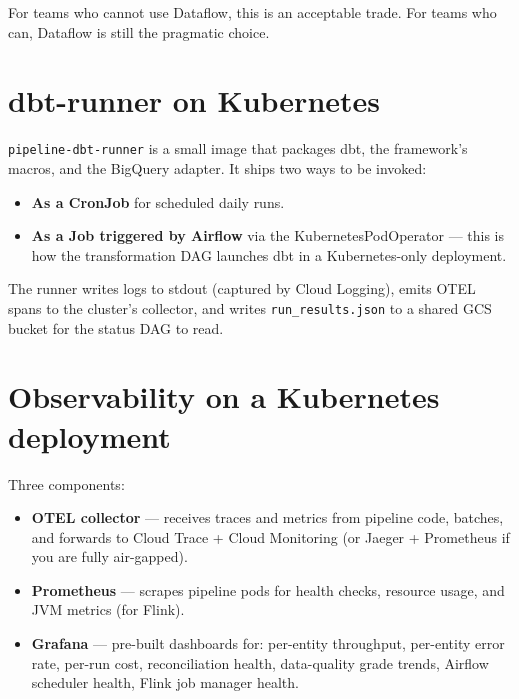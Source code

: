 \documentclass[
  11pt,
  british,
  oneside]{book}
\providecommand{\tightlist}{%
  \setlength{\itemsep}{0pt}\setlength{\parskip}{0pt}}
\begin{document}
For teams who cannot use Dataflow, this is an acceptable trade. For
teams who can, Dataflow is still the pragmatic choice.

\hypertarget{dbt-runner-on-kubernetes}{%
\section{dbt-runner on Kubernetes}\label{dbt-runner-on-kubernetes}}

\texttt{pipeline-dbt-runner} is a small image that packages dbt, the
framework's macros, and the BigQuery adapter. It ships two ways to be
invoked:

\begin{itemize}
\tightlist
\item
  \textbf{As a CronJob} for scheduled daily runs.
\item
  \textbf{As a Job triggered by Airflow} via the KubernetesPodOperator
  --- this is how the transformation DAG launches dbt in a
  Kubernetes-only deployment.
\end{itemize}

The runner writes logs to stdout (captured by Cloud Logging), emits OTEL
spans to the cluster's collector, and writes \texttt{run\_results.json}
to a shared GCS bucket for the status DAG to read.

\hypertarget{observability-on-a-kubernetes-deployment}{%
\section{Observability on a Kubernetes
deployment}\label{observability-on-a-kubernetes-deployment}}

Three components:

\begin{itemize}
\tightlist
\item
  \textbf{OTEL collector} --- receives traces and metrics from pipeline
  code, batches, and forwards to Cloud Trace + Cloud Monitoring (or
  Jaeger + Prometheus if you are fully air-gapped).
\item
  \textbf{Prometheus} --- scrapes pipeline pods for health checks,
  resource usage, and JVM metrics (for Flink).
\item
  \textbf{Grafana} --- pre-built dashboards for: per-entity throughput,
  per-entity error rate, per-run cost, reconciliation health,
  data-quality grade trends, Airflow scheduler health, Flink job manager
  health.
\end{itemize}
\end{document}

